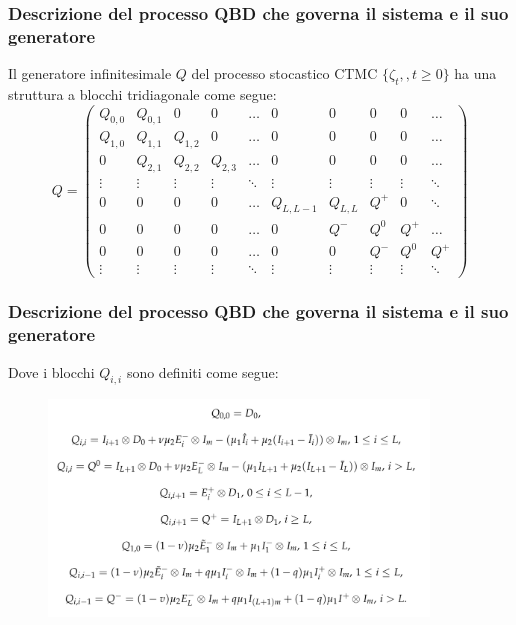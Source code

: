 \documentclass{beamer}
\begin{document}
\begin{frame}
    \frametitle{Descrizione del processo QBD che governa il sistema e il suo generatore}
    \begin{theorem}
        Il generatore infinitesimale $Q$ del processo stocastico CTMC $\{\zeta_t,,t\geq 0\}$ ha una struttura a blocchi tridiagonale come segue:
        \small{\begin{equation*}
            Q =
            \begin{pmatrix}
                Q_{0,0} & Q_{0,1} & 0 & 0 & \dots & 0 & 0& 0 & 0 & \dots \\
                Q_{1,0} & Q_{1,1} & Q_{1,2} & 0 & \dots & 0 & 0 & 0 & 0 & \dots \\
                0 & Q_{2,1} & Q_{2,2} & Q_{2,3} & \dots & 0 & 0 & 0 & 0 & \dots \\
                \vdots & \vdots & \vdots & \vdots & \ddots & \vdots & \vdots & \vdots & \vdots & \ddots \\
                0 & 0 & 0 & 0 & \dots & Q_{L,L-1} & Q_{L,L} & Q^+& 0 & \ddots \\
                0 & 0 & 0 & 0 & \dots & 0 & Q^- & Q^0 & Q^+ & \dots \\
                0 & 0 & 0 & 0 & \dots & 0 & 0 & Q^- & Q^0 & Q^+ \\
                \vdots & \vdots & \vdots & \vdots & \ddots & \vdots & \vdots & \vdots & \vdots & \ddots
            \end{pmatrix}
        \end{equation*}}
    \end{theorem}
\end{frame}


\begin{frame}
    \frametitle{Descrizione del processo QBD che governa il sistema e il suo generatore}
    Dove i blocchi $Q_{i,i}$ sono definiti come segue:
    \begin{figure}[h]
        \centering
        \includegraphics[width=0.9\textwidth]{T9RIVqa.png}
    \end{figure}
\end{frame}
\end{document}
